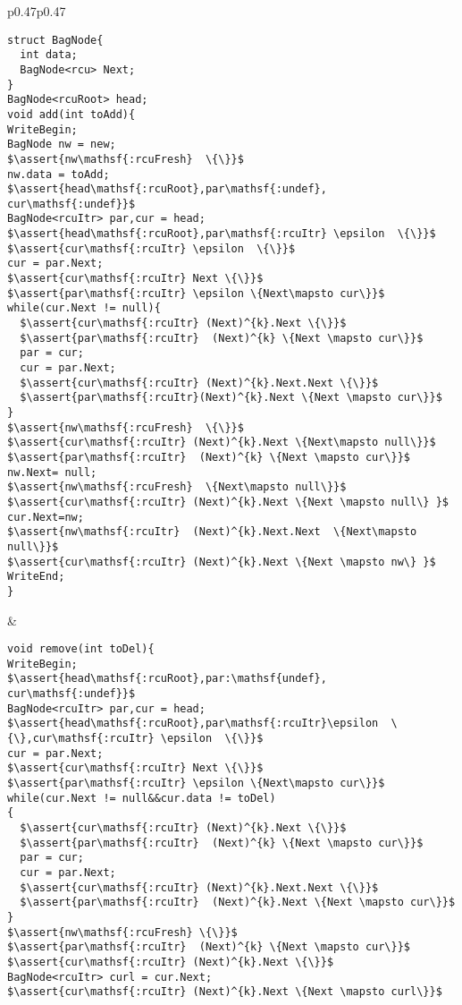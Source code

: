\begin{figure*}[t!]
\begin{tabular}{p{}p{}}
\begin{lstlisting}[basicstyle=\scriptsize\ttfamily]
struct BagNode{
  int data;
  BagNode<rcu> Next;
}
BagNode<rcuRoot> head;
void add(int toAdd){
WriteBegin;
BagNode nw = new;
$\assert{nw\mathsf{:rcuFresh}  \{\}}$
nw.data = toAdd;
$\assert{head\mathsf{:rcuRoot},par\mathsf{:undef}, cur\mathsf{:undef}}$
BagNode<rcuItr> par,cur = head;
$\assert{head\mathsf{:rcuRoot},par\mathsf{:rcuItr} \epsilon  \{\}}$
$\assert{cur\mathsf{:rcuItr} \epsilon  \{\}}$
cur = par.Next;
$\assert{cur\mathsf{:rcuItr} Next \{\}}$
$\assert{par\mathsf{:rcuItr} \epsilon \{Next\mapsto cur\}}$
while(cur.Next != null){
  $\assert{cur\mathsf{:rcuItr} (Next)^{k}.Next \{\}}$
  $\assert{par\mathsf{:rcuItr}  (Next)^{k} \{Next \mapsto cur\}}$
  par = cur;
  cur = par.Next;
  $\assert{cur\mathsf{:rcuItr} (Next)^{k}.Next.Next \{\}}$
  $\assert{par\mathsf{:rcuItr}(Next)^{k}.Next \{Next \mapsto cur\}}$
}
$\assert{nw\mathsf{:rcuFresh}  \{\}}$
$\assert{cur\mathsf{:rcuItr} (Next)^{k}.Next \{Next\mapsto null\}}$
$\assert{par\mathsf{:rcuItr}  (Next)^{k} \{Next \mapsto cur\}}$
nw.Next= null;
$\assert{nw\mathsf{:rcuFresh}  \{Next\mapsto null\}}$
$\assert{cur\mathsf{:rcuItr} (Next)^{k}.Next \{Next \mapsto null\} }$
cur.Next=nw;
$\assert{nw\mathsf{:rcuItr}  (Next)^{k}.Next.Next  \{Next\mapsto null\}}$
$\assert{cur\mathsf{:rcuItr} (Next)^{k}.Next \{Next \mapsto nw\} }$
WriteEnd;
}
\end{lstlisting}&
\begin{lstlisting}[basicstyle=\scriptsize\ttfamily]
void remove(int toDel){
WriteBegin;
$\assert{head\mathsf{:rcuRoot},par:\mathsf{undef}, cur\mathsf{:undef}}$
BagNode<rcuItr> par,cur = head;
$\assert{head\mathsf{:rcuRoot},par\mathsf{:rcuItr}\epsilon  \{\},cur\mathsf{:rcuItr} \epsilon  \{\}}$
cur = par.Next;
$\assert{cur\mathsf{:rcuItr} Next \{\}}$
$\assert{par\mathsf{:rcuItr} \epsilon \{Next\mapsto cur\}}$
while(cur.Next != null&&cur.data != toDel)
{
  $\assert{cur\mathsf{:rcuItr} (Next)^{k}.Next \{\}}$
  $\assert{par\mathsf{:rcuItr}  (Next)^{k} \{Next \mapsto cur\}}$
  par = cur;
  cur = par.Next;
  $\assert{cur\mathsf{:rcuItr} (Next)^{k}.Next.Next \{\}}$
  $\assert{par\mathsf{:rcuItr}  (Next)^{k}.Next \{Next \mapsto cur\}}$
}
$\assert{nw\mathsf{:rcuFresh} \{\}}$
$\assert{par\mathsf{:rcuItr}  (Next)^{k} \{Next \mapsto cur\}}$
$\assert{cur\mathsf{:rcuItr} (Next)^{k}.Next \{\}}$
BagNode<rcuItr> curl = cur.Next;
$\assert{cur\mathsf{:rcuItr} (Next)^{k}.Next \{Next \mapsto curl\}}$

\end{lstlisting}
\end{tabular}
\end{figure*}
